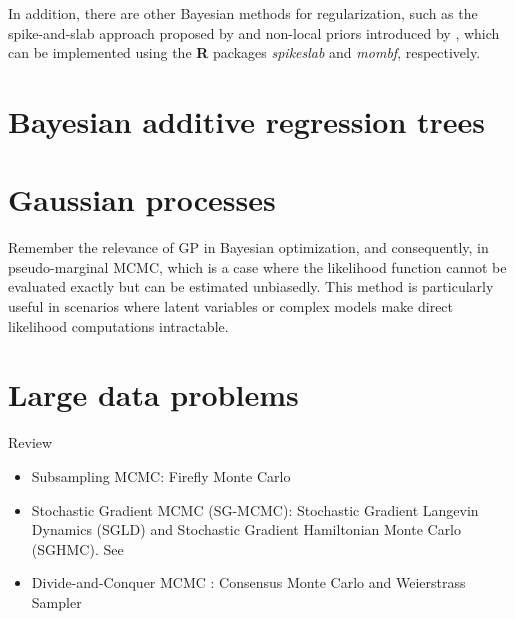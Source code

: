 In addition, there are other Bayesian methods for regularization, such as the spike-and-slab approach proposed by \cite{Ishwaran2005} and non-local priors introduced by \cite{johnson2012bayesian}, which can be implemented using the \textbf{R} packages \textit{spikeslab} and \textit{mombf}, respectively.



\section{Bayesian additive regression trees}\label{sec13_3}

\section{Gaussian processes}\label{13_4}

Remember the relevance of GP in Bayesian optimization, and consequently, in pseudo-marginal MCMC, which is a case where the likelihood function cannot be evaluated exactly but can be estimated unbiasedly. This method is particularly useful in scenarios where latent variables or complex models make direct likelihood computations intractable.

\section{Large data problems}\label{13_5}
Review \cite{bardenet2017markov}
\begin{itemize}
	\item Subsampling MCMC: Firefly Monte Carlo \cite{Maclaurin2015}
	\item Stochastic Gradient MCMC (SG-MCMC): Stochastic Gradient Langevin Dynamics (SGLD) and Stochastic Gradient Hamiltonian Monte Carlo (SGHMC). See \cite{nemeth2021stochastic,song2020extended,baker2019sgmcmc,chen2014stochastic,welling2011bayesian}
	\item Divide-and-Conquer MCMC \cite{quiroz2018subsampling,quiroz2019speeding}: Consensus Monte Carlo \cite{rendell2020global,scott2022bayes} and Weierstrass Sampler \cite{wu2017average}
\end{itemize}


